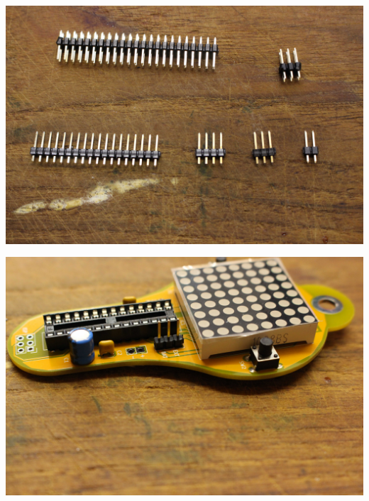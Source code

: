 \documentclass{article}
\begin{document}
\vspace{0.5cm}

\begin{minipage}[b]{0.5\textwidth}
	\includegraphics[width=\textwidth]{Bilder/IMG_5604.JPG}
\end{minipage}
\begin{minipage}[b]{0.5\textwidth}
	\includegraphics[width=\textwidth]{Bilder/IMG_5605.JPG}
\end{minipage}

\vspace{0.5cm}
\end{document}
